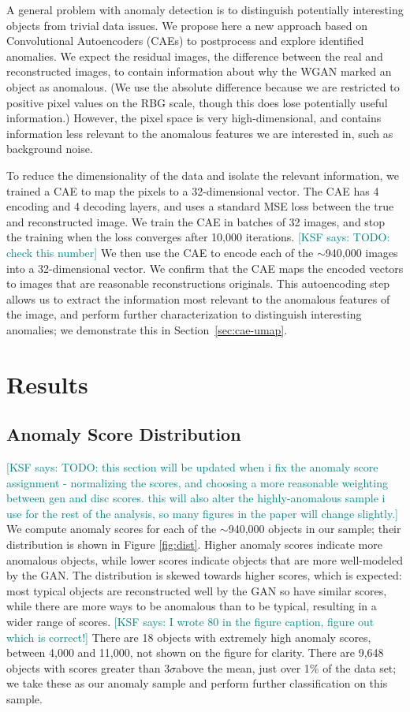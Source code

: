 \documentclass[fleqn,usenatbib,useAMS]{mnras}
\newcommand{\sig}{$\sigma$} %
\newcommand{\KSF}[1]{\textcolor{teal}{{[KSF says: #1]}}}
\begin{document}
A general problem with anomaly detection is to distinguish potentially interesting objects from trivial data issues.  
We propose here a new approach based on Convolutional Autoencoders (CAEs) to postprocess and explore identified anomalies. 
We expect the residual images, the difference between the real and reconstructed images, to contain information about why the WGAN marked an object as anomalous.
(We use the absolute difference because we are restricted to positive pixel values on the RBG scale, though this does lose potentially useful information.)
However, the pixel space is very high-dimensional, and contains information less relevant to the anomalous features we are interested in, such as background noise.

To reduce the dimensionality of the data and isolate the relevant information, we trained a CAE to map the pixels to a 32-dimensional vector.
The CAE has 4 encoding and 4 decoding layers, and uses a standard MSE loss between the true and reconstructed image.
We train the CAE in batches of 32 images, and stop the training when the loss converges after 10,000 iterations. \KSF{TODO: check this number}
We then use the CAE to encode each of the $\sim$940,000 images into a 32-dimensional vector.
We confirm that the CAE maps the encoded vectors to images that are reasonable reconstructions originals.
This autoencoding step allows us to extract the information most relevant to the anomalous features of the image, and perform further characterization to distinguish interesting anomalies; we demonstrate this in Section~\ref{sec:cae-umap}.

\section{Results}
\label{sec:results}

\subsection{Anomaly Score Distribution}
\label{sec:sanom_dist}

\KSF{TODO: this section will be updated when i fix the anomaly score assignment - normalizing the scores, and choosing a more reasonable weighting between gen and disc scores. this will also alter the highly-anomalous sample i use for the rest of the analysis, so many figures in the paper will change slightly.}
We compute anomaly scores for each of the $\sim$940,000 objects in our sample; their distribution is shown in Figure \ref{fig:dist}.
Higher anomaly scores indicate more anomalous objects, while lower scores indicate objects that are more well-modeled by the GAN.
The distribution is skewed towards higher scores, which is expected: most typical objects are reconstructed well by the GAN so have similar scores, while there are more ways to be anomalous than to be typical, resulting in a wider range of scores.
\KSF{I wrote 80 in the figure caption, figure out which is correct!}
There are 18 objects with extremely high anomaly scores, between 4,000 and 11,000, not shown on the figure for clarity.
There are 9,648 objects with scores greater than 3\sig above the mean, just over 1\% of the data set; we take these as our anomaly sample and perform further classification on this sample.
\end{document}
